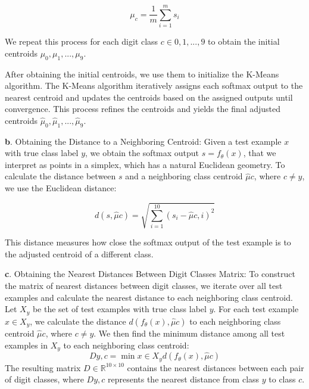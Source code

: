 \begin{equation}
\mu_c = \frac{1}{m} \sum_{i=1}^m s_i
\label{eq:mean_softmax_output}
\end{equation}

We repeat this process for each digit class $c \in {0, 1, ..., 9}$ to obtain the initial centroids $\mu_0, \mu_1, ..., \mu_9$.

After obtaining the initial centroids, we use them to initialize the K-Means algorithm. The K-Means algorithm iteratively assigns each softmax output to the nearest centroid and updates the centroids based on the assigned outputs until convergence. This process refines the centroids and yields the final adjusted centroids $\hat{\mu}_0, \hat{\mu}_1, ..., \hat{\mu}_9$.

\textbf{b}. Obtaining the Distance to a Neighboring Centroid:
Given a test example $x$ with true class label $y$, we obtain the softmax output $s = f_\theta(x)$, that we interpret as points in a simplex, which has a natural Euclidean geometry. To calculate the distance between $s$ and a neighboring class centroid $\hat{\mu}c$, where $c \neq y$, we use the Euclidean distance:

\begin{equation}
d(s, \hat{\mu}c) = \sqrt{\sum\limits_{i=1}^{10} (s_i - \hat{\mu}{c,i})^2}
\label{eq:euclidean_distance_to_neighboring_centroid}
\end{equation}

This distance measures how close the softmax output of the test example is to the adjusted centroid of a different class.

\textbf{c}. Obtaining the Nearest Distances Between Digit Classes Matrix:
To construct the matrix of nearest distances between digit classes, we iterate over all test examples and calculate the nearest distance to each neighboring class centroid. Let $X_y$ be the set of test examples with true class label $y$. For each test example $x \in X_y$, we calculate the distance $d(f_\theta(x), \hat{\mu}c)$ to each neighboring class centroid $\hat{\mu}c$, where $c \neq y$.
We then find the minimum distance among all test examples in $X_y$ to each neighboring class centroid:
\begin{equation}
D{y,c} = \min{x \in X_y} d(f_\theta(x), \hat{\mu}c)
\label{eq:min_distance_to_near_centroid}
\end{equation}
The resulting matrix $D \in \mathbb{R}^{10 \times 10}$ contains the nearest distances between each pair of digit classes, where $D{y,c}$ represents the nearest distance from class $y$ to class $c$.

